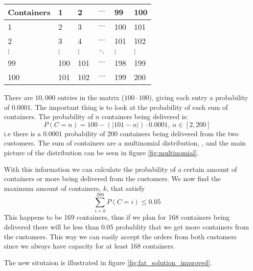 \begin{example}
\begin{center}
\begin{tabular}{l||l|l|lll|l|l|}
\textbf{Containers}   & 1 & 2 & \multicolumn{3}{c|}{$\cdots$} & 99 & 100 \\
\hline
\hline
1  & 2 & 3 & \multicolumn{3}{c|}{$\cdots$} & 100& 101 \\
\hline
2  & 3 & 4 & \multicolumn{3}{c|}{$\cdots$} & 101& 102 \\
\hline
$\vdots$ &$\vdots$&$\vdots$ &\multicolumn{3}{c|}{$\ddots$}&$\vdots$& $\vdots$\\
\hline
99  & 100 & 101 & \multicolumn{3}{c|}{$\cdots$} & 198&199\\
\hline
100 & 101 & 102 & \multicolumn{3}{c|}{$\cdots$} & 199&200\\
\hline
\end{tabular}
\end{center}

There are $10,000$ entries in the matrix ($100 \cdot 100$), giving
each entry a probability of $0.0001$. The important thing is to
look at the probability of each sum of containers. The probability of
$n$ containers being delivered is:
\[
P(C = n) = 100-(\vert 101-n \vert)\cdot 0.0001,\ n \in [2,200]
\]
i.e there is a $0.0001$ probability of 200 containers being delivered
from the two customers. The sum of containers are a multinomial
distribution, \cite{sandsynlighed}, and the main picture of the
distribution can be seen in figure \ref{fig:multinomial}. 

With this information we can calculate the
probability of a certain amount of containers or more being delivered
from the customers. We now find the maximum amount of containers, $k$,
that satisfy 
\[
\sum_{i=k}^{200} P(C = i) \leq 0.05
\]
This happens to be 169 containers, thus if we plan for 168 containers
being delivered there will be less than $0.05$ probablity that we get more
containers from the customers. This way we can easily accept the
orders from both customers since we always have capacity for at least
168 containers.

The new situtaion is illustrated in figure
\ref{fig:fat_solution_improved}.

\end{example}

